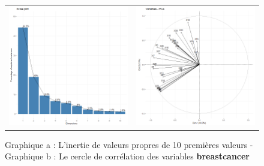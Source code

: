 \documentclass[a4paper,11pt,oneside,roman]{article}
\begin{document}
\begin{figure}[htb]
    \centering
    \begin{tabular}{c|c}
    \includegraphics[scale = .3]{./discrimination/breastcancer/eig.png} &
    \includegraphics[scale = .3]{discrimination/breastcancer/variables.png}
    \end{tabular}
    \caption{Graphique a : L'inertie de valeurs propres de 10 premières valeurs - Graphique b : Le cercle de corrélation des variables \textbf{breastcancer}}
    \label{fig:my_label}
\end{figure}
\end{document}
